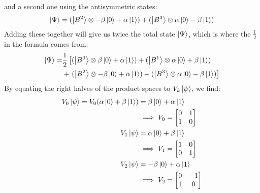 \documentclass[a4paper,twoside]{article}
\begin{document}
\begin{itemize}
\begin{tcolorbox}[breakable]
\begin{equation}
            \end{equation}
            and a second one using the antisymmetric states:
            \begin{equation}
                \ket{\Psi} = (\ket{B^2} \otimes - \beta \ket{0} + \alpha \ket{1}) + (\ket{B^3} \otimes \alpha \ket{0} - \beta \ket{1})
            \end{equation}
            Adding these together will give us twice the total state $ \ket{\Psi} $, which is where the $ \frac{1}{2} $ in the formula comes from:
            \begin{equation}
                \begin{split}
                \ket{\Psi} =& \frac{1}{2} \left[ (\ket{B^0} \otimes \beta \ket{0} + \alpha \ket{1}) + (\ket{B^1} \otimes \alpha \ket{0} + \beta \ket{1})\right.\\
                &+ \left.(\ket{B^2} \otimes - \beta \ket{0} + \alpha \ket{1}) + (\ket{B^3} \otimes \alpha \ket{0} - \beta \ket{1}) \right]
                \end{split}
            \end{equation}
            By equating the right halves of the product spaces to $ V_k \ket{\psi} $, we find:
            \begin{align}
                V_0 \ket{\psi} = V_0 (\alpha \ket{0} + \beta \ket{1}) &= \beta \ket{0} + \alpha \ket{1} \\
                & \implies V_0 = 
                \begin{bmatrix}
                    0&1\\
                    1&0
                \end{bmatrix}\\
                V_1 \ket{\psi} &= \alpha \ket{0} + \beta \ket{1} \\
                & \implies V_1 = 
                \begin{bmatrix}
                    1&0\\
                    0&1
                \end{bmatrix}\\
                V_2 \ket{\psi} &= - \beta \ket{0} + \alpha \ket{1} \\
                & \implies V_2 = 
                \begin{bmatrix}
                    0&-1\\
                    1&0
                \end{bmatrix}\\

\end{align}
\end{tcolorbox}
\end{itemize}
\end{document}

